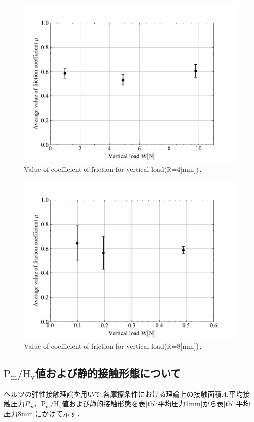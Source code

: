 \begin{figure}[htbp]
    \centering %
    \includegraphics[width=100truemm,clip]{fig/fig_4mm.pdf}
    \caption{Value of coefficient of friction for vertical load(R=4[mm])．}
    \label{fig:fig_4mm}
\end{figure}
\clearpage
\begin{figure}[htbp]
    \centering %
    \includegraphics[width=100truemm,clip]{fig/fig_8mm.pdf}
    \caption{Value of coefficient of friction for vertical load(R=8[mm])．}
    \label{fig:fig_8mm}
\end{figure}

\subsection{$\mathrm{P_m/H_v}$値および静的接触形態について}
ヘルツの弾性接触理論を用いて,各摩擦条件における理論上の接触面積$A$,平均接
触圧力$P_m$，$\mathrm{P_m/H_v}$値および静的接触形態を表\ref{tbl:平均圧力1mm}から表\ref{tbl:平均圧力8mm}にかけて示す．

